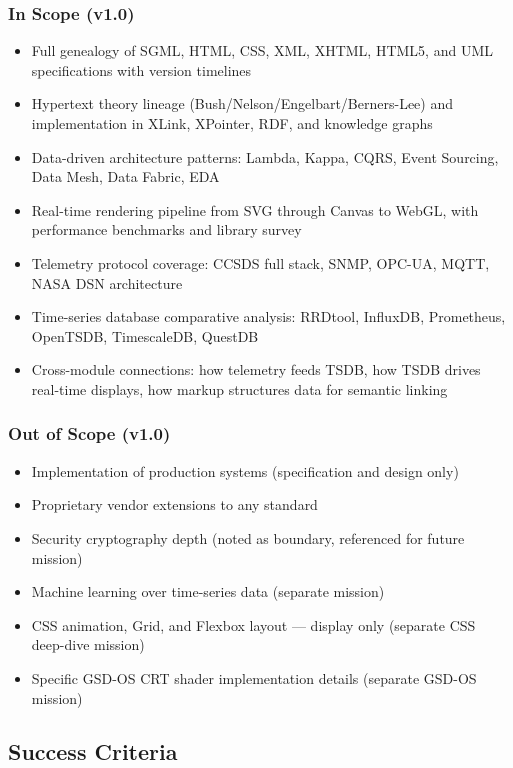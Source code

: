 \documentclass[11pt,letterpaper]{article}
\begin{document}
\subsubsection{In Scope (v1.0)}
\begin{itemize}[noitemsep]
  \item Full genealogy of SGML, HTML, CSS, XML, XHTML, HTML5, and UML specifications with version timelines
  \item Hypertext theory lineage (Bush/Nelson/Engelbart/Berners-Lee) and implementation in XLink, XPointer, RDF, and knowledge graphs
  \item Data-driven architecture patterns: Lambda, Kappa, CQRS, Event Sourcing, Data Mesh, Data Fabric, EDA
  \item Real-time rendering pipeline from SVG through Canvas to WebGL, with performance benchmarks and library survey
  \item Telemetry protocol coverage: CCSDS full stack, SNMP, OPC-UA, MQTT, NASA DSN architecture
  \item Time-series database comparative analysis: RRDtool, InfluxDB, Prometheus, OpenTSDB, TimescaleDB, QuestDB
  \item Cross-module connections: how telemetry feeds TSDB, how TSDB drives real-time displays, how markup structures data for semantic linking
\end{itemize}

\subsubsection{Out of Scope (v1.0)}
\begin{itemize}[noitemsep]
  \item Implementation of production systems (specification and design only)
  \item Proprietary vendor extensions to any standard
  \item Security cryptography depth (noted as boundary, referenced for future mission)
  \item Machine learning over time-series data (separate mission)
  \item CSS animation, Grid, and Flexbox layout --- display only (separate CSS deep-dive mission)
  \item Specific GSD-OS CRT shader implementation details (separate GSD-OS mission)
\end{itemize}

\subsection{Success Criteria}
\end{document}
